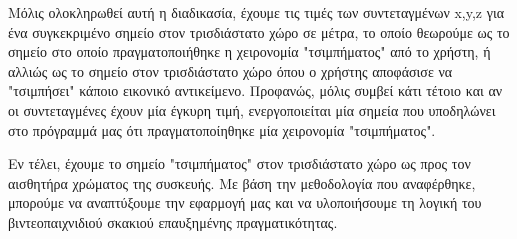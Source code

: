 Μόλις ολοκληρωθεί αυτή η διαδικασία, έχουμε τις τιμές των συντεταγμένων x,y,z για ένα συγκεκριμένο σημείο στον τρισδιάστατο χώρο σε μέτρα, το οποίο θεωρούμε ως το σημείο στο οποίο πραγματοποιήθηκε η χειρονομία "τσιμπήματος" από το χρήστη, ή αλλιώς ως το σημείο στον τρισδιάστατο χώρο όπου ο χρήστης αποφάσισε να "τσιμπήσει" κάποιο εικονικό αντικείμενο. Προφανώς, μόλις συμβεί κάτι τέτοιο και αν οι συντεταγμένες έχουν μία έγκυρη τιμή, ενεργοποιείται μία σημεία που υποδηλώνει στο πρόγραμμά μας ότι πραγματοποίηθηκε μία χειρονομία "τσιμπήματος". 

Εν τέλει, έχουμε το σημείο "τσιμπήματος" στον τρισδιάστατο χώρο ως προς τον αισθητήρα χρώματος της συσκευής. Με βάση την μεθοδολογία που αναφέρθηκε, μπορούμε να αναπτύξουμε την εφαρμογή μας και να υλοποιήσουμε τη λογική του βιντεοπαιχνιδιού σκακιού επαυξημένης πραγματικότητας. 




